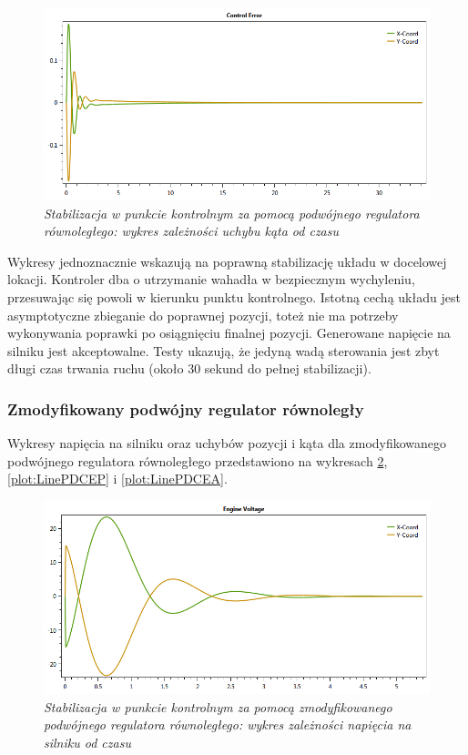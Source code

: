 \documentclass[12pt, oneside]{report}
\theoremstyle{definition}
\begin{document}
\begin{figure}[H]
	\centering
		\includegraphics[width = 350pt]{LinePIDCEA} 
		\caption{\textit{Stabilizacja w punkcie kontrolnym za pomocą podwójnego regulatora równoległego: wykres zależności uchybu kąta od czasu}}
		\label{plot:LinePIDCEA}
\end{figure}

Wykresy jednoznacznie wskazują na poprawną stabilizację układu w docelowej lokacji. Kontroler dba o utrzymanie wahadła w bezpiecznym wychyleniu, przesuwając się powoli w kierunku punktu kontrolnego. Istotną cechą układu jest asymptotyczne zbieganie do poprawnej pozycji, toteż nie ma potrzeby wykonywania poprawki po osiągnięciu finalnej pozycji. Generowane napięcie na silniku jest akceptowalne. Testy ukazują, że jedyną wadą sterowania jest zbyt długi czas trwania ruchu (około 30 sekund do pełnej stabilizacji).

\subsubsection{Zmodyfikowany podwójny regulator równoległy}
Wykresy napięcia na silniku oraz uchybów pozycji i kąta dla zmodyfikowanego podwójnego regulatora równoległego przedstawiono na wykresach \ref{plot:LinePDEV}, \ref{plot:LinePDCEP} i \ref{plot:LinePDCEA}.

\begin{figure}[H]
	\centering
		\includegraphics[width = 350pt]{LinePDEV} 
		\caption{\textit{Stabilizacja w punkcie kontrolnym za pomocą zmodyfikowanego podwójnego regulatora równoległego: wykres zależności napięcia na silniku od czasu}}
		\label{plot:LinePDEV}
\end{figure}
\end{document}
